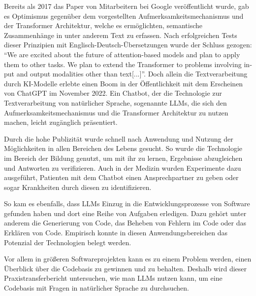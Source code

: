 \documentclass[../main.tex]{subfiles}
\begin{document}
Bereits als 2017 das Paper  von Mitarbeitern bei Google veröffentlicht wurde, gab es Optimismus gegenüber dem vorgestellten Aufmerksamkeitsmechanismus und der Transformer Architektur, welche es ermöglichten, semantische Zusammenhänge in unter anderem Text zu erfassen.
Nach erfolgreichen Tests dieser Prinzipien mit Englisch-Deutsch-Übersetzungen wurde der Schluss gezogen: \foreignquote{english}{We are excited about the future of attention-based models and plan to apply them to other tasks. We plan to extend the Transformer to problems involving input and output modalities other than text[...]}\cite*{vaswani2017attention}.
Doch allein die Textverarbeitung durch KI-Modelle erlebte einen Boom in der Öffentlichkeit mit dem Erscheinen von ChatGPT im November 2022.
Ein Chatbot, der die Technologie zur Textverarbeitung von natürlicher Sprache, sogenannte \glspl{LLM}, die sich den Aufmerksamkeitsmechanismus und die Transformer Architektur zu nutzen machen, leicht zugänglich präsentiert. \cite{chatgpt2023}

Durch die hohe Publizität wurde schnell nach Anwendung und Nutzung der Möglichkeiten in allen Bereichen des Lebens gesucht.
So wurde die Technologie im Bereich der Bildung genutzt, um mit ihr zu lernen, Ergebnisse abzugleichen und Antworten zu verifizieren.
Auch in der Medizin wurden Experimente dazu ausgeführt, Patienten mit dem Chatbot einen Ansprechpartner zu geben oder sogar Krankheiten durch diesen zu identifizieren.
\cite*{liu2023summary}

So kam es ebenfalls, dass \glspl{LLM} Einzug in die Entwicklungsprozesse von Software gefunden haben und dort eine Reihe von Aufgaben erledigen.
Dazu gehört unter anderem die Generierung von Code, das Beheben von Fehlern im Code oder das Erklären von Code.
Empirisch konnte in diesen Anwendungsbereichen das Potenzial der Technologien belegt werden.
\cite*{tian2023chatgpt}

Vor allem in größeren Softwareprojekten kann es zu einem Problem werden, einen Überblick über die Codebasis zu gewinnen und zu behalten.
Deshalb wird dieser Praxistransferbericht untersuchen, wie man \glspl{LLM} nutzen kann, um eine Codebasis mit Fragen in natürlicher Sprache zu durchsuchen.
\end{document}
